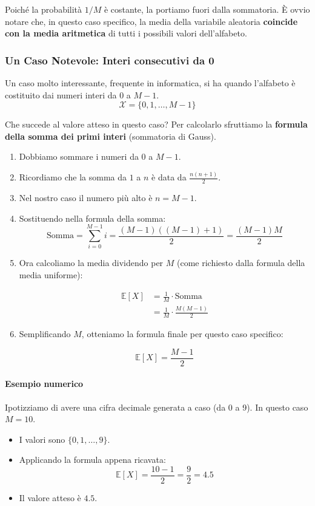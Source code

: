 Poiché la probabilità $1/M$ è costante, la portiamo fuori dalla sommatoria. È ovvio notare che, in questo caso specifico, la media della variabile aleatoria \textbf{coincide con la media aritmetica} di tutti i possibili valori dell'alfabeto.

\subsubsection{Un Caso Notevole: Interi consecutivi da 0}

Un caso molto interessante, frequente in informatica, si ha quando l'alfabeto è costituito dai numeri interi da $0$ a $M-1$.
\[ \mathcal{X} = \{0, 1, \dots, M-1\} \]

Che succede al valore atteso in questo caso? Per calcolarlo sfruttiamo la \textbf{formula della somma dei primi interi} (sommatoria di Gauss).

\begin{enumerate}
    \item Dobbiamo sommare i numeri da $0$ a $M-1$.
    \item Ricordiamo che la somma da $1$ a $n$ è data da $\frac{n(n+1)}{2}$.
    \item Nel nostro caso il numero più alto è $n = M-1$.
    \item Sostituendo nella formula della somma:
    \[ \text{Somma} = \sum_{i=0}^{M-1} i = \frac{(M-1)((M-1)+1)}{2} = \frac{(M-1)M}{2} \]
    \item Ora calcoliamo la media dividendo per $M$ (come richiesto dalla formula della media uniforme):
    
    \begin{equation}
    \begin{aligned}
    \mathbb{E}[X] &= \frac{1}{M} \cdot \text{Somma} \\
    &= \frac{1}{M} \cdot \frac{M(M-1)}{2}
    \end{aligned}
    \end{equation}
    
    \item Semplificando $M$, otteniamo la formula finale per questo caso specifico:
    
    \begin{equation}
    \boxed{\mathbb{E}[X] = \frac{M-1}{2}}
    \end{equation}
\end{enumerate}

\paragraph{Esempio numerico}
Ipotizziamo di avere una cifra decimale generata a caso (da 0 a 9). In questo caso $M=10$.
\begin{itemize}
    \item I valori sono $\{0, 1, \dots, 9\}$.
    \item Applicando la formula appena ricavata:
    \[ \mathbb{E}[X] = \frac{10-1}{2} = \frac{9}{2} = 4.5 \]
    \item Il valore atteso è $4.5$.
\end{itemize}


